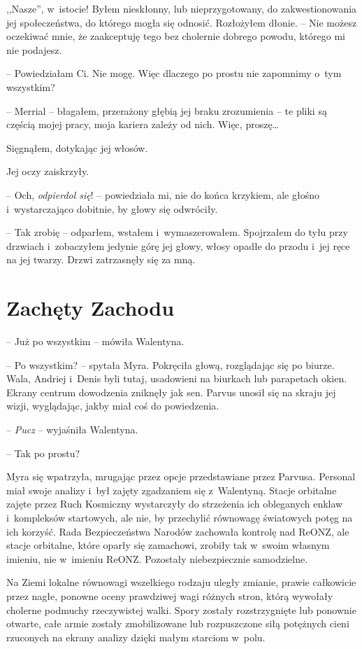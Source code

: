 \documentclass[oneside,polish,11pt,sfheadings]{mwbk}
\begin{document}
,,Nasze'', w~istocie! Byłem nieskłonny, lub nieprzygotowany, do
zakwestionowania jej społeczeństwa, do którego mogła się odnosić.
Rozłożyłem dłonie. -- Nie możesz oczekiwać mnie, że zaakceptuję tego bez
cholernie dobrego powodu, którego mi nie podajesz.

-- Powiedziałam Ci. Nie mogę. Więc dlaczego po prostu nie zapomnimy o~tym
wszystkim?

-- Merrial -- błagałem, przerażony głębią jej braku zrozumienia -- te pliki
są częścią mojej pracy, moja kariera zależy od nich. Więc, proszę\ldots

Sięgnąłem, dotykając jej włosów.

Jej oczy zaiskrzyły.

-- Och, \textit{odpierdol się}! -- powiedziała mi, nie do końca krzykiem,
ale głośno i~wystarczająco dobitnie, by głowy się odwróciły.

-- Tak zrobię -- odparłem, wstałem i~wymaszerowałem. Spojrzałem do tyłu
przy drzwiach i~zobaczyłem jedynie górę jej głowy, włosy opadłe do
przodu i~jej ręce na jej twarzy. Drzwi zatrzasnęły się za mną.


\chapter{Zachęty Zachodu}

-- Już po wszystkim -- mówiła Walentyna.

-- Po wszystkim? -- spytała Myra. Pokręciła głową, rozglądając się po
biurze. Wala, Andriej i~Denis byli tutaj, usadowieni na biurkach lub
parapetach okien. Ekrany centrum dowodzenia zniknęły jak sen. Parvus
unosił się na skraju jej wizji, wyglądając, jakby miał coś do
powiedzenia.

-- \textit{Pucz} -- wyjaśniła Walentyna.

-- Tak po prostu?

Myra się wpatrzyła, mrugając przez opcje przedstawiane przez Parvusa.
Personal miał swoje analizy i~był zajęty zgadzaniem się z~Walentyną.
Stacje orbitalne zajęte przez Ruch Kosmiczny wystarczyły do strzeżenia
ich obleganych enklaw i~kompleksów startowych, ale nie, by przechylić
równowagę światowych potęg na ich korzyść. Rada Bezpieczeństwa Narodów
zachowała kontrolę nad ReONZ, ale stacje orbitalne, które oparły się
zamachowi, zrobiły tak w~swoim własnym imieniu, nie w~imieniu ReONZ.
Pozostały niebezpiecznie samodzielne.

Na Ziemi lokalne równowagi wszelkiego rodzaju uległy zmianie, prawie
całkowicie przez nagłe, ponowne oceny prawdziwej wagi różnych stron,
którą wywołały cholerne podmuchy rzeczywistej walki. Spory zostały
rozstrzygnięte lub ponownie otwarte, całe armie zostały zmobilizowane
lub rozpuszczone siłą potężnych cieni rzuconych na ekrany analizy dzięki
małym starciom w~polu.
\end{document}
